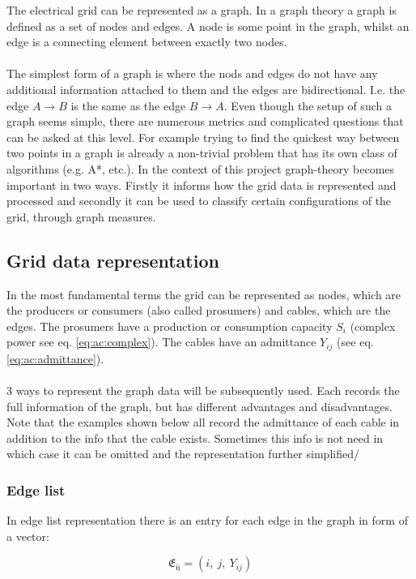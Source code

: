 The electrical grid can be represented as a graph. 
In a graph theory a graph is defined as a set of nodes and edges. A node
is some point in the graph, whilst an edge is a connecting element between exactly
two nodes.\\
\\

The simplest form of a graph is where the nods and edges do not have
any additional information attached to them and the edges are bidirectional.
I.e. the edge $A \to B$ is the same as the edge $B \to A$. Even though the setup
of such a graph seems simple, there are numerous metrics and complicated questions
that can be asked at this level. For example trying to find the quickest way between
two points in a graph is already a non-trivial problem that has its own class of algorithms
(e.g. A*, etc.). In the context of this project graph-theory becomes important in two ways.
Firstly it informs how the grid data is represented and processed and secondly it can
be used to classify certain configurations of the grid, through graph measures.

\subsection{Grid data representation}

In the most fundamental terms the grid can be represented as nodes, which are the 
producers or consumers (also called prosumers) and cables, which are the edges.
The prosumers have a production or consumption capacity $S_i$ (complex power see eq. \ref{eq:ac:complex}).
The cables have an admittance $Y_{ij}$ (see eq. \ref{eq:ac:admittance}).\\
\\
3 ways to represent the graph data will be subsequently used. 
Each records the full information of the graph, but
has different advantages and disadvantages. Note that the examples shown below all record
the admittance of each cable in addition to the info that the cable exists. Sometimes
this info is not need in which case it can be omitted and the representation further simplified/

\subsubsection{Edge list}

In edge list representation there is an entry for each edge in the graph in form of a vector:

\begin{equation}    
    \mathfrak{E_{ij}} = (i,\ j,\ Y_{ij})
\end{equation}

